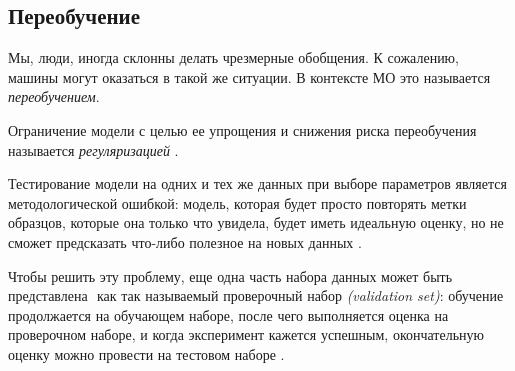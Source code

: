 \subsection{Переобучение}
Мы, люди, иногда склонны делать чрезмерные обобщения. К сожалению,
машины могут оказаться в такой же ситуации. В контексте МО это называется
\emph{переобучением}.

Ограничение модели с целью ее упрощения и снижения риска переобучения
называется \emph{регуляризацией} \cite{scikitBook}.

Тестирование модели на одних и тех же данных при выборе параметров является
методологической ошибкой: модель, которая будет просто повторять метки
образцов, которые она только что увидела, будет иметь идеальную оценку, но
не сможет предсказать что-либо полезное на новых данных \cite{scikitTuning}.

Чтобы решить эту проблему, еще одна часть набора данных может быть представлена ​​
как так называемый проверочный набор \emph{(validation set)}: обучение продолжается
на обучающем наборе, после чего выполняется оценка на проверочном наборе, и
когда эксперимент кажется успешным, окончательную оценку можно провести на
тестовом наборе \cite{scikitCV}.
